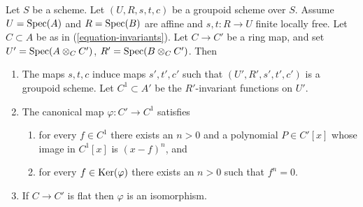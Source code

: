 \begin{lemma}
\label{lemma-invariants-base-change}
Let $S$ be a scheme. Let $(U, R, s, t, c)$ be a groupoid scheme over $S$.
Assume $U = \mathop{\mathrm{Spec}}(A)$ and $R = \mathop{\mathrm{Spec}}(B)$ are affine and
$s, t : R \to U$ finite locally free. Let $C \subset A$ be as in
(\ref{equation-invariants}). Let $C \to C'$ be a ring map, and set
$U' = \mathop{\mathrm{Spec}}(A \otimes_C C')$,
$R' = \mathop{\mathrm{Spec}}(B \otimes_C C')$.
Then
\begin{enumerate}
\item The maps $s, t, c$ induce maps $s', t', c'$ such that
$(U', R', s', t', c')$ is a groupoid scheme. Let $C^1 \subset A'$
be the $R'$-invariant functions on $U'$.
\item The canonical map $\varphi : C' \to C^1$ satisfies
\begin{enumerate}
\item for every $f \in C^1$ there exists an $n > 0$ and a
polynomial $P \in C'[x]$ whose image in $C^1[x]$ is
$(x - f)^n$, and
\item for every $f \in \mathop{\mathrm{Ker}}(\varphi)$ there exists
an $n > 0$ such that $f^n = 0$.
\end{enumerate}
\item If $C \to C'$ is flat then $\varphi$ is an isomorphism.
\end{enumerate}
\end{lemma}

